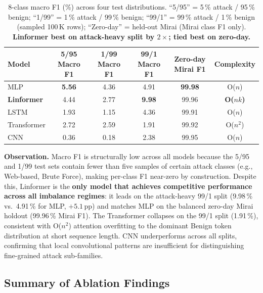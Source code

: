 \begin{table}[h]
\centering
\caption{8-class macro F1 (\%) across four test distributions.
``5/95'' = 5\,\% attack / 95\,\% benign;
``1/99'' = 1\,\% attack / 99\,\% benign;
``99/1'' = 99\,\% attack / 1\,\% benign (sampled 100\,K rows);
``Zero-day'' = held-out Mirai (Mirai class F1 only).
\textbf{Linformer best on attack-heavy split by $2\times$; tied best on zero-day.}}
\label{tab:8class}
\begin{tabular}{lccccc}
\toprule
\textbf{Model} &
\textbf{5/95 Macro F1} &
\textbf{1/99 Macro F1} &
\textbf{99/1 Macro F1} &
\textbf{Zero-day Mirai F1} &
\textbf{Complexity} \\
\midrule
MLP         & \textbf{5.56} & 4.36 & 4.91          & \textbf{99.98} & O($n$)   \\
\textbf{Linformer}   & 4.44 & 2.77 & \textbf{9.98} & 99.96          & \textbf{O($nk$)} \\
LSTM        & 1.93 & 1.15 & 4.36          & 99.91          & O($n$)   \\
Transformer & 2.72 & 2.59 & 1.91          & 99.92          & O($n^2$) \\
CNN         & 0.36 & 0.18 & 2.38          & 99.95          & O($n$)   \\
\bottomrule
\end{tabular}
\end{table}

\textbf{Observation.}
Macro F1 is structurally low across all models because the 5/95 and 1/99 test
sets contain fewer than five samples of certain attack classes (e.g.,
Web-based, Brute Force), making per-class F1 near-zero by construction.
Despite this, Linformer is the \textbf{only model that achieves competitive
performance across all imbalance regimes}: it leads on the attack-heavy 99/1
split (9.98\,\% vs.\ 4.91\,\% for MLP, $+5.1$\,pp) and matches MLP on the
balanced zero-day Mirai holdout (99.96\,\% Mirai F1).
The Transformer collapses on the 99/1 split (1.91\,\%), consistent with
O($n^2$) attention overfitting to the dominant Benign token distribution at
short sequence length.
CNN underperforms across all splits, confirming that local convolutional
patterns are insufficient for distinguishing fine-grained attack sub-families.

\subsection{Summary of Ablation Findings}
\label{sec:ablation_summary}


